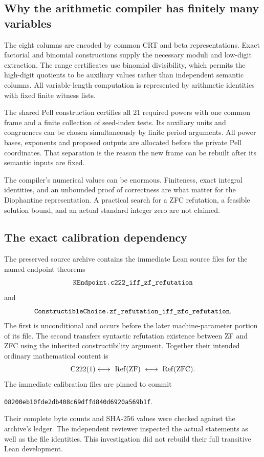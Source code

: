 \subsection{Why the arithmetic compiler has finitely many variables}

The eight columns are encoded by common CRT and beta representations. Exact factorial and binomial constructions supply the necessary moduli and low-digit extraction. The range certificates use binomial divisibility, which permits the high-digit quotients to be auxiliary values rather than independent semantic columns. All variable-length computation is represented by arithmetic identities with fixed finite witness lists.

The shared Pell construction certifies all 21 required powers with one common frame and a finite collection of seed-index tests. Its auxiliary units and congruences can be chosen simultaneously by finite period arguments. All power bases, exponents and proposed outputs are allocated before the private Pell coordinates. That separation is the reason the new frame can be rebuilt after its semantic inputs are fixed.

The compiler's numerical values can be enormous. Finiteness, exact integral identities, and an unbounded proof of correctness are what matter for the Diophantine representation. A practical search for a ZFC refutation, a feasible solution bound, and an actual standard integer zero are not claimed.

\subsection{The exact calibration dependency}

The preserved source archive contains the immediate Lean source files for the named endpoint theorems
\[
\code{KEndpoint.c222_iff_zf_refutation}
\]
and
\[
\code{ConstructibleChoice.zf_refutation_iff_zfc_refutation}.
\]
The first is unconditional and occurs before the later machine-parameter portion of its file. The second transfers syntactic refutation existence between ZF and ZFC using the inherited constructibility argument. Together their intended ordinary mathematical content is
\begin{equation}\label{eq:logicalbridge}
\mathrm{C222}(1) \longleftrightarrow\
\operatorname{Ref}(\mathrm{ZF})\ \longleftrightarrow\ \operatorname{Ref}(\mathrm{ZFC}).
\end{equation}
The immediate calibration files are pinned to commit
\begin{center}\small\texttt{08200eb10fde2db408c69dffd840d6920a569b1f}.\end{center}
Their complete byte counts and SHA-256 values were checked against the archive's ledger. The independent reviewer inspected the actual statements as well as the file identities. This investigation did not rebuild their full transitive Lean development.\cite{archive,calibration}

